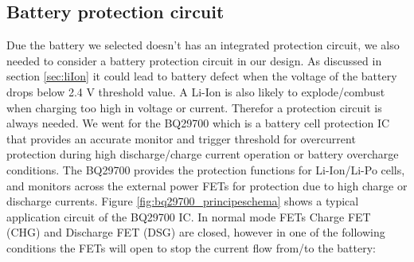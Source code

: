 \documentclass[11pt,a4paper]{article}
\begin{document}
\subsection{Battery protection circuit}\label{sec:bat_prot_circuit}
Due the battery we selected doesn't has an integrated protection circuit, we also needed to consider a battery protection circuit in our design. As discussed in section \ref{sec:liIon} it could lead to battery defect when the voltage of the battery drops below 2.4 V threshold value. A Li-Ion is also likely to explode/combust when charging too high in voltage or current. Therefor a protection circuit is always needed. We went for the BQ29700 which is a battery cell protection IC that provides an accurate monitor and trigger threshold for overcurrent protection during high discharge/charge current operation or battery overcharge conditions. The BQ29700 provides the protection functions for Li-Ion/Li-Po cells, and monitors across the external power FETs for protection due to high charge or discharge currents. Figure \ref{fig:bq29700_principeschema} shows a typical application circuit of the BQ29700 IC. In normal mode FETs Charge FET (CHG) and Discharge FET (DSG) are closed, however in one of the following conditions the FETs will open to stop the current flow from/to the battery:
\end{document}
